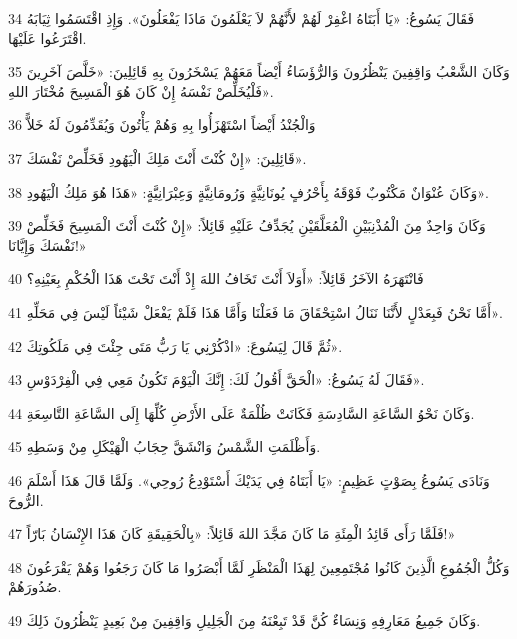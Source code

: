 \par 34 فَقَالَ يَسُوعُ: «يَا أَبَتَاهُ اغْفِرْ لَهُمْ لأَنَّهُمْ لاَ يَعْلَمُونَ مَاذَا يَفْعَلُونَ». وَإِذِ اقْتَسَمُوا ثِيَابَهُ اقْتَرَعُوا عَلَيْهَا.
\par 35 وَكَانَ الشَّعْبُ وَاقِفِينَ يَنْظُرُونَ وَالرُّؤَسَاءُ أَيْضاً مَعَهُمْ يَسْخَرُونَ بِهِ قَائِلِينَ: «خَلَّصَ آخَرِينَ فَلْيُخَلِّصْ نَفْسَهُ إِنْ كَانَ هُوَ الْمَسِيحَ مُخْتَارَ اللهِ».
\par 36 وَالْجُنْدُ أَيْضاً اسْتَهْزَأُوا بِهِ وَهُمْ يَأْتُونَ وَيُقَدِّمُونَ لَهُ خَلاًّ
\par 37 قَائِلِينَ: «إِنْ كُنْتَ أَنْتَ مَلِكَ الْيَهُودِ فَخَلِّصْ نَفْسَكَ».
\par 38 وَكَانَ عُنْوَانٌ مَكْتُوبٌ فَوْقَهُ بِأَحْرُفٍ يُونَانِيَّةٍ وَرُومَانِيَّةٍ وَعِبْرَانِيَّةٍ: «هَذَا هُوَ مَلِكُ الْيَهُودِ».
\par 39 وَكَانَ وَاحِدٌ مِنَ الْمُذْنِبَيْنِ الْمُعَلَّقَيْنِ يُجَدِّفُ عَلَيْهِ قَائِلاً: «إِنْ كُنْتَ أَنْتَ الْمَسِيحَ فَخَلِّصْ نَفْسَكَ وَإِيَّانَا!»
\par 40 فَانْتَهَرَهُ الآخَرُ قَائِلاً: «أَوَلاَ أَنْتَ تَخَافُ اللهَ إِذْ أَنْتَ تَحْتَ هَذَا الْحُكْمِ بِعَيْنِهِ؟
\par 41 أَمَّا نَحْنُ فَبِعَدْلٍ لأَنَّنَا نَنَالُ اسْتِحْقَاقَ مَا فَعَلْنَا وَأَمَّا هَذَا فَلَمْ يَفْعَلْ شَيْئاً لَيْسَ فِي مَحَلِّهِ».
\par 42 ثُمَّ قَالَ لِيَسُوعَ: «اذْكُرْنِي يَا رَبُّ مَتَى جِئْتَ فِي مَلَكُوتِكَ».
\par 43 فَقَالَ لَهُ يَسُوعُ: «الْحَقَّ أَقُولُ لَكَ: إِنَّكَ الْيَوْمَ تَكُونُ مَعِي فِي الْفِرْدَوْسِ».
\par 44 وَكَانَ نَحْوُ السَّاعَةِ السَّادِسَةِ فَكَانَتْ ظُلْمَةٌ عَلَى الأَرْضِ كُلِّهَا إِلَى السَّاعَةِ التَّاسِعَةِ.
\par 45 وَأَظْلَمَتِ الشَّمْسُ وَانْشَقَّ حِجَابُ الْهَيْكَلِ مِنْ وَسَطِهِ.
\par 46 وَنَادَى يَسُوعُ بِصَوْتٍ عَظِيمٍ: «يَا أَبَتَاهُ فِي يَدَيْكَ أَسْتَوْدِعُ رُوحِي». وَلَمَّا قَالَ هَذَا أَسْلَمَ الرُّوحَ.
\par 47 فَلَمَّا رَأَى قَائِدُ الْمِئَةِ مَا كَانَ مَجَّدَ اللهَ قَائِلاً: «بِالْحَقِيقَةِ كَانَ هَذَا الإِنْسَانُ بَارّاً!»
\par 48 وَكُلُّ الْجُمُوعِ الَّذِينَ كَانُوا مُجْتَمِعِينَ لِهَذَا الْمَنْظَرِ لَمَّا أَبْصَرُوا مَا كَانَ رَجَعُوا وَهُمْ يَقْرَعُونَ صُدُورَهُمْ.
\par 49 وَكَانَ جَمِيعُ مَعَارِفِهِ وَنِسَاءٌ كُنَّ قَدْ تَبِعْنَهُ مِنَ الْجَلِيلِ وَاقِفِينَ مِنْ بَعِيدٍ يَنْظُرُونَ ذَلِكَ.
